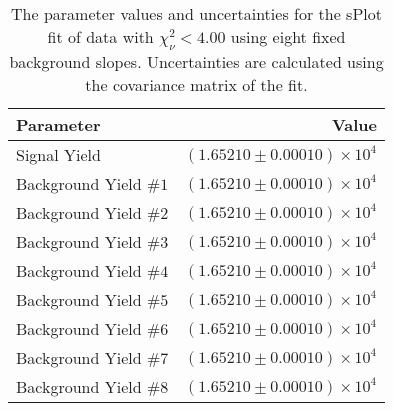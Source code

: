 
\begin{table}[ht]
    \begin{center}
        \begin{tabular}{lr}\toprule
            Parameter & Value \\\midrule
            Signal Yield & $(1.65210 \pm 0.00010) \times 10^{4}$ \\
            Background Yield $\#1$ & $(1.65210 \pm 0.00010) \times 10^{4}$ \\
            Background Yield $\#2$ & $(1.65210 \pm 0.00010) \times 10^{4}$ \\
            Background Yield $\#3$ & $(1.65210 \pm 0.00010) \times 10^{4}$ \\
            Background Yield $\#4$ & $(1.65210 \pm 0.00010) \times 10^{4}$ \\
            Background Yield $\#5$ & $(1.65210 \pm 0.00010) \times 10^{4}$ \\
            Background Yield $\#6$ & $(1.65210 \pm 0.00010) \times 10^{4}$ \\
            Background Yield $\#7$ & $(1.65210 \pm 0.00010) \times 10^{4}$ \\
            Background Yield $\#8$ & $(1.65210 \pm 0.00010) \times 10^{4}$ \\\bottomrule
        \end{tabular}
        \caption{The parameter values and uncertainties for the sPlot fit of data with $\chi^2_\nu < 4.00$ using eight fixed background slopes. Uncertainties are calculated using the covariance matrix of the fit.}\label{tab:splot-fit-results-chisqdof-4.00-fixed-8}
    \end{center}
\end{table}
